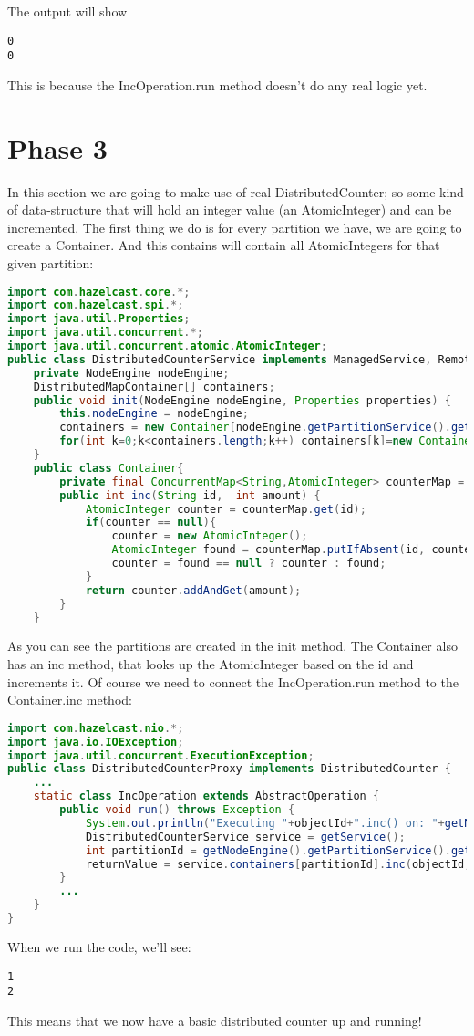 The output will show
\begin{lstlisting}
0
0
\end{lstlisting}
This is because the IncOperation.run method doesn't do any real logic yet.

\section{Phase 3}
In this section we are going to make use of real DistributedCounter; so some kind of data-structure that will hold an integer value (an AtomicInteger) and can be incremented. The first thing we do is for every partition we have, we are going to create a Container. And this contains will contain all AtomicIntegers for that given partition:
\begin{lstlisting}[language=java]
import com.hazelcast.core.*;
import com.hazelcast.spi.*;
import java.util.Properties;
import java.util.concurrent.*;
import java.util.concurrent.atomic.AtomicInteger;
public class DistributedCounterService implements ManagedService, RemoteService {
    private NodeEngine nodeEngine;
    DistributedMapContainer[] containers;
    public void init(NodeEngine nodeEngine, Properties properties) {
        this.nodeEngine = nodeEngine;
        containers = new Container[nodeEngine.getPartitionService().getPartitionCount()];
        for(int k=0;k<containers.length;k++) containers[k]=new Container();
    }
    public class Container{
        private final ConcurrentMap<String,AtomicInteger> counterMap = new ConcurrentHashMap<>();
        public int inc(String id,  int amount) {
            AtomicInteger counter = counterMap.get(id);
            if(counter == null){
                counter = new AtomicInteger();
                AtomicInteger found = counterMap.putIfAbsent(id, counter);
                counter = found == null ? counter : found;
            }
            return counter.addAndGet(amount);
        }
    }
\end{lstlisting}
As you can see the partitions are created in the init method. The Container also has an inc method, that looks up the AtomicInteger based on the id and increments it. Of course we need to connect the IncOperation.run method to the Container.inc method:
\begin{lstlisting}[language=java]
import com.hazelcast.nio.*;
import java.io.IOException;
import java.util.concurrent.ExecutionException;
public class DistributedCounterProxy implements DistributedCounter {
    ... 
    static class IncOperation extends AbstractOperation {
        public void run() throws Exception {
            System.out.println("Executing "+objectId+".inc() on: "+getNodeEngine().getThisAddress());
            DistributedCounterService service = getService();
            int partitionId = getNodeEngine().getPartitionService().getPartitionId(objectId);
            returnValue = service.containers[partitionId].inc(objectId, amount);
        }
        ...
    }
}
\end{lstlisting}
When we run the code, we'll see:
\begin{lstlisting}
1
2
\end{lstlisting}
This means that we now have a basic distributed counter up and running!

